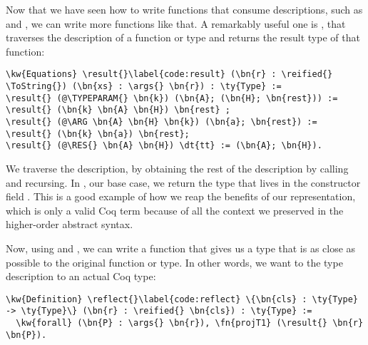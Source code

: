 Now that we have seen how to write functions that consume \reified{} descriptions, such as \args{} and \appenddescs{}, we can write more functions like that. A remarkably useful one is \result{}, that traverses the \reified{} description of a function or \constructor{} type and returns the result type of that function:


\begin{Verbatim}
\kw{Equations} \result{}\label{code:result} (\bn{r} : \reified{} \ToString{}) (\bn{xs} : \args{} \bn{r}) : \ty{Type} :=
\result{} (@\TYPEPARAM{} \bn{k}) (\bn{A}; (\bn{H}; \bn{rest})) := \result{} (\bn{k} \bn{A} \bn{H}) \bn{rest} ;
\result{} (@\ARG \bn{A} \bn{H} \bn{k}) (\bn{a}; \bn{rest}) := \result{} (\bn{k} \bn{a}) \bn{rest};
\result{} (@\RES{} \bn{A} \bn{H}) \dt{tt} := (\bn{A}; \bn{H}).
\end{Verbatim}

We traverse the \reified{} description, by obtaining the rest of the description by calling  and recursing. In \RES{}, our base case, we return the type that lives in the constructor field . This is a good example of how we reap the benefits of our representation, which is only a valid Coq term because of all the context we preserved in the higher-order abstract syntax.

Now, using \args{} and \result{}, we can write a function that gives us a type that is as close as possible to the original function or \constructor{} type. In other words, we want to  the type description to an actual Coq type:

\newcommand{\reflect}{\hyperref[code:reflect]{\fn{reflect}}}
\begin{Verbatim}
\kw{Definition} \reflect{}\label{code:reflect} \{\bn{cls} : \ty{Type} -> \ty{Type}\} (\bn{r} : \reified{} \bn{cls}) : \ty{Type} :=
  \kw{forall} (\bn{P} : \args{} \bn{r}), \fn{projT1} (\result{} \bn{r} \bn{P}).
\end{Verbatim}

